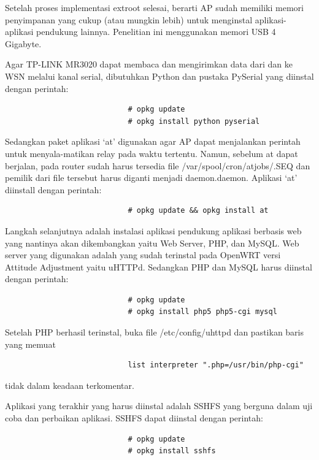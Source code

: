 \begin{enumerate}
					Setelah proses implementasi extroot selesai, berarti AP sudah memiliki memori penyimpanan yang cukup (atau mungkin lebih) untuk menginstal aplikasi-aplikasi pendukung lainnya. Penelitian ini menggunakan memori USB 4 Gigabyte.

					Agar TP-LINK MR3020 dapat membaca dan mengirimkan data dari dan ke WSN melalui kanal serial, dibutuhkan Python dan pustaka PySerial yang diinstal dengan perintah:
					\begingroup
					    \fontsize{10pt}{12pt}\selectfont
					    \begin{verbatim}
							# opkg update
							# opkg install python pyserial
					    \end{verbatim}  
					\endgroup

					Sedangkan paket aplikasi `at' digunakan agar AP dapat menjalankan perintah untuk menyala-matikan relay pada waktu tertentu. Namun, sebelum at dapat berjalan, pada router sudah harus tersedia file /var/spool/cron/atjobs/.SEQ dan pemilik dari file tersebut harus diganti menjadi daemon.daemon. Aplikasi `at' diinstall dengan perintah:
					\begingroup
					    \fontsize{10pt}{12pt}\selectfont
					    \begin{verbatim}
							# opkg update && opkg install at
					    \end{verbatim}  
					\endgroup
					
					Langkah selanjutnya adalah instalasi aplikasi pendukung aplikasi berbasis web yang nantinya akan dikembangkan yaitu Web Server, PHP, dan MySQL. Web server yang digunakan adalah yang sudah terinstal pada OpenWRT versi Attitude Adjustment yaitu uHTTPd. Sedangkan PHP dan MySQL harus diinstal dengan perintah:
					\begingroup
					    \fontsize{10pt}{12pt}\selectfont
					    \begin{verbatim}
							# opkg update
							# opkg install php5 php5-cgi mysql
					    \end{verbatim}  
					\endgroup

					Setelah PHP berhasil terinstal, buka file /etc/config/uhttpd dan pastikan baris yang memuat
					\begingroup
					    \fontsize{10pt}{12pt}\selectfont
					    \centering
					    \begin{verbatim}
							list interpreter ".php=/usr/bin/php-cgi"
					    \end{verbatim}  
					\endgroup
					tidak dalam keadaan terkomentar.

					Aplikasi yang terakhir yang harus diinstal adalah SSHFS yang berguna dalam uji coba dan perbaikan aplikasi. SSHFS dapat diinstal dengan perintah:
					\begingroup
					    \fontsize{10pt}{12pt}\selectfont
					    \begin{verbatim}
							# opkg update
							# opkg install sshfs
					    \end{verbatim}  
					\endgroup


\end{enumerate}
